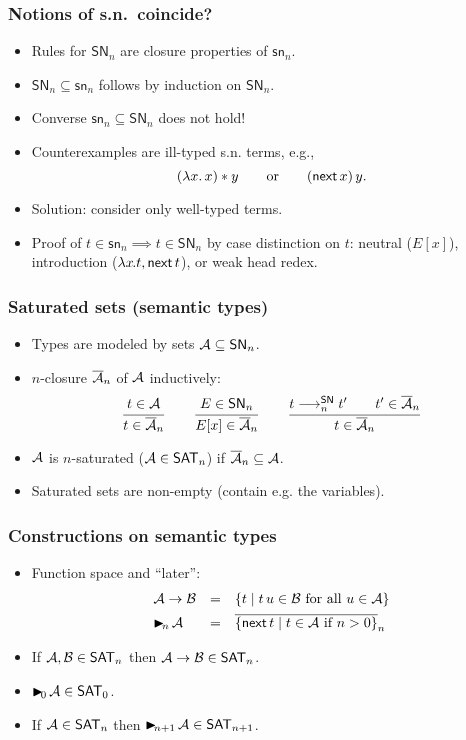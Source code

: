 \documentclass[t]{beamer}
\newcommand{\mybox}[1]{\mbox{\color{black}#1}}
\newcommand{\nex}{\tnext\,}
\newcommand{\redSN}{\red^\SN}
\newcommand{\clos}[1]{\overline{#1}}
\renewcommand{\sn}{\mathsf{sn}}
\renewcommand{\SN}{\mathsf{SN}}
\newcommand{\SAT}{\mathsf{SAT}}
\newcommand{\slater}[1]{\tlater\!_{#1}\,}
\begin{document}
\begin{frame}%
  \frametitle{Notions of s.n.\ coincide?}
  \begin{itemize}
  \item Rules for $\SN_n$ are closure properties of $\sn_n$.
  \item $\SN_n \subseteq \sn_n$ follows by induction on $\SN_n$.
  \item Converse $\sn_n \subseteq \SN_n$ does not hold!
  \item Counterexamples are ill-typed s.n. terms, e.g.,
\[
  (\lambda x.\, x) \ast y
\qquad \mybox{or}\qquad
  (\nex x)\,y
.\]
  \item Solution: consider only well-typed terms.
  \item Proof of $t \in \sn_n \implies t \in \SN_n$ by case
    distinction on $t$: neutral ($E[x]$), introduction ($\lam
    x t, \nex t$), or weak head redex.
  \end{itemize}
\end{frame}


\begin{frame}%
  \frametitle{Saturated sets (semantic types)}
  \begin{itemize}
  \item Types are modeled by sets $\A \subseteq \SN_n$.
  \item $n$-closure $\clos \A _n$ of $\mathcal{A}$ inductively:
\[
  \ru{t \in \A}{t \in \clos \A _n}
\qquad
  \ru{E \in \SN_n}{E[x] \in \clos \A _n}
\qquad
  \ru{t \redSN_n t' \qquad t' \in \clos \A _n
    }{t \in \clos \A _n}
\]
  \item $\mathcal{A}$ is $n$-saturated ($\A \in \SAT_n$) if $\clos\A_n
    \subseteq \A$.
  \item Saturated sets are non-empty (contain e.g. the variables).
  \end{itemize}
\end{frame}


\begin{frame}%
  \frametitle{Constructions on semantic types}
  \begin{itemize}
  \item Function space and ``later'':
\[
\begin{array}{lcl}
  \A \to \B   & = & \{ t \mid t\,u \in \B \mforall u \in \A \} \\[1ex]
  \slater n \A & = & \clos{\{ \nex t \mid t \in \A \mif n>0 \}}_n \\
\end{array}
\]
  \item If $\A,\B \in \SAT_n$ then $\A \to \B \in \SAT_n$.
  \item $\slater 0 \A \in \SAT_0$.
  \item If $\A \in \SAT_n$ then $\slater {n+1} \A \in \SAT_{n+1}$.
  \end{itemize}
\end{frame}
\end{document}
